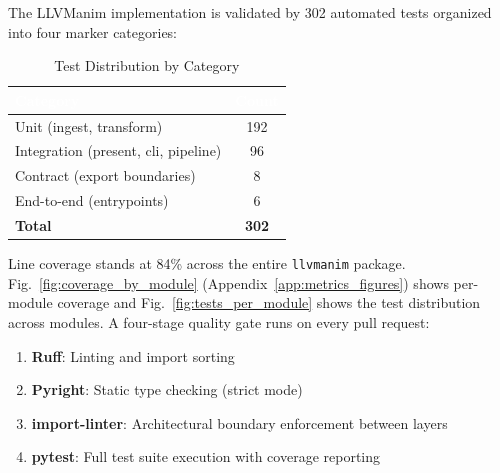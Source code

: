 The LLVManim implementation is validated by 302 automated tests organized into four marker categories:

\begin{table}[htbp]
\caption{Test Distribution by Category}
\label{tab:tests}
\centering
\renewcommand{\arraystretch}{1.3}
\begin{tabularx}{\columnwidth}{|X|c|}
\hline
\rowcolor[HTML]{4472C4}
\textcolor{white}{\textbf{Category}} & \textcolor{white}{\textbf{Count}} \\ \hline
Unit (ingest, transform)             & 192 \\ \hline
Integration (present, cli, pipeline) &  96 \\ \hline
Contract (export boundaries)         &   8 \\ \hline
End-to-end (entrypoints)             &   6 \\ \hline
\textbf{Total}                       & \textbf{302} \\ \hline
\end{tabularx}
\end{table}

Line coverage stands at 84\% across the entire \texttt{llvmanim} package. Fig.~\ref{fig:coverage_by_module} (Appendix~\ref{app:metrics_figures}) shows per-module coverage and Fig.~\ref{fig:tests_per_module} shows the test distribution across modules. A four-stage quality gate runs on every pull request:
\begin{enumerate}
    \item \textbf{Ruff}: Linting and import sorting
    \item \textbf{Pyright}: Static type checking (strict mode)
    \item \textbf{import-linter}: Architectural boundary enforcement between layers
    \item \textbf{pytest}: Full test suite execution with coverage reporting
\end{enumerate}

